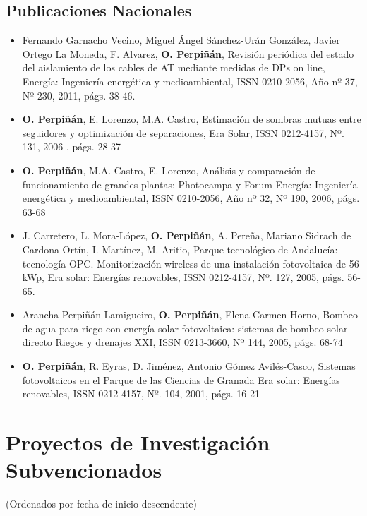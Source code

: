 \documentclass[article, a4paper]{memoir}
\begin{document}
\subsection{Publicaciones Nacionales}
\label{sec:org90fd370}

\begin{itemize}
\item Fernando Garnacho Vecino, Miguel Ángel Sánchez-Urán González, Javier Ortego La Moneda, F. Alvarez, \textbf{O. Perpiñán}, Revisión periódica del estado del aislamiento de los cables de AT mediante medidas de DPs on line, Energía: Ingeniería energética y medioambiental, ISSN 0210-2056, Año nº 37, Nº 230, 2011, págs. 38-46.

\item \textbf{O. Perpiñán}, E. Lorenzo, M.A. Castro, Estimación de sombras mutuas entre seguidores y optimización de separaciones, Era Solar, ISSN 0212-4157, Nº. 131, 2006 , págs. 28-37

\item \textbf{O. Perpiñán}, M.A. Castro, E. Lorenzo, Análisis y comparación de funcionamiento de grandes plantas: Photocampa y Forum Energía: Ingeniería energética y medioambiental, ISSN 0210-2056, Año nº 32, Nº 190, 2006, págs. 63-68

\item J. Carretero, L. Mora-López, \textbf{O. Perpiñán}, A. Pereña, Mariano Sidrach de Cardona Ortín, I. Martínez, M. Aritio, Parque tecnológico de Andalucía: tecnología OPC. Monitorización wireless de una instalación fotovoltaica de 56 kWp, Era solar: Energías renovables, ISSN 0212-4157, Nº. 127, 2005, págs. 56-65.

\item Arancha Perpiñán Lamigueiro, \textbf{O. Perpiñán}, Elena Carmen Horno, Bombeo de agua para riego con energía solar fotovoltaica: sistemas de bombeo solar directo Riegos y drenajes XXI, ISSN 0213-3660, Nº 144, 2005, págs. 68-74

\item \textbf{O. Perpiñán}, R. Eyras, D. Jiménez, Antonio Gómez Avilés-Casco, Sistemas fotovoltaicos en el Parque de las Ciencias de Granada Era solar: Energías renovables, ISSN 0212-4157, Nº. 104, 2001, págs. 16-21
\end{itemize}


\section{Proyectos de Investigación Subvencionados}
\label{sec:org3e6a8d4}
(Ordenados por fecha de inicio descendente)
\end{document}
